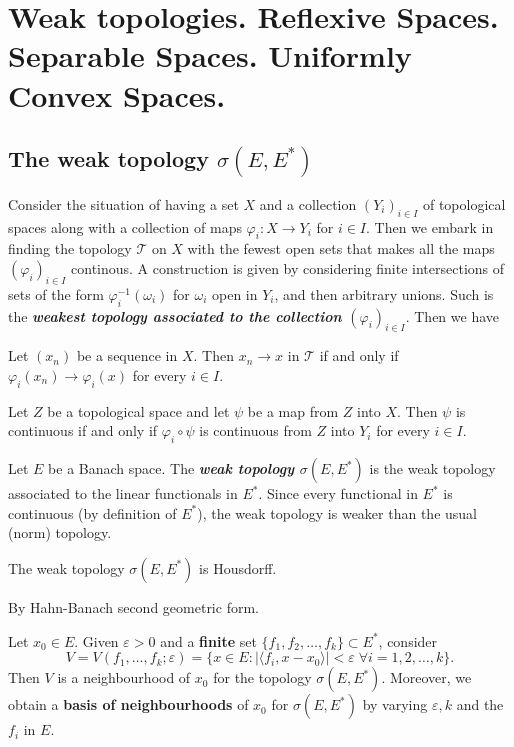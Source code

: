 \documentclass{article}
\theoremstyle{definition}
\numberwithin{equation}{section}
\begin{document}
	\section{Weak topologies. Reflexive Spaces. Separable Spaces. Uniformly Convex Spaces.}
	\subsection{The weak topology $\sigma(E,E^*)$}
	Consider the situation of having a set $X$ and a collection $(Y_i)_{i\in I}$ of topological spaces along with a collection of maps $\varphi_i:X\to Y_i$ for $i\in I$. Then we embark in finding the topology $\mathcal{T}$ on $X$ with the fewest open sets that makes all the maps $(\varphi_i)_{i\in I}$ continous. A construction is given by considering finite intersections of sets of the form $\varphi_i^{-1}(\omega_i)$ for $\omega_i$ open in $Y_i$, and then arbitrary unions. Such is the \textbf{\textit{weakest topology associated to the collection $(\varphi_i)_{i\in I}$}}. Then we have
	\begin{prop}
		Let $(x_n)$ be a sequence in $X$. Then $x_n\to x$ in $\mathcal{T}$ if and only if $\varphi_i(x_n)\to \varphi_i(x)$ for every $i\in I$.
	\end{prop}
	\begin{prop}\label{prop:universal-property-weak-topology}
		Let $Z$ be a topological space and let $\psi$ be a map from $Z$ into $X$. Then $\psi$ is continuous if and only if $\varphi_i\circ\psi$ is continuous from $Z$ into $Y_i$ for every $i\in I$.
	\end{prop}
	Let $E$ be a Banach space. The \textbf{\textit{weak topology $\sigma (E,E^*)$}} is the weak topology associated to the linear functionals in $E^*$. Since every functional in $E^*$ is continuous (by definition of $E^*$), the weak topology is weaker than the usual (norm) topology.
	\begin{prop}
		The weak topology $\sigma(E,E^*)$ is Housdorff.
	\end{prop}
	\begin{prop}
		By Hahn-Banach second geometric form.
	\end{prop}
	\begin{prop}\label{prop:neighbourhoods-weak-topology}
		Let $x_0\in E$. Given $\varepsilon>0$ and a \textbf{finite} set $\{f_1,f_2,\ldots,f_k\}\subset E^*$, consider
		\[V=V(f_1,\ldots,f_k;\varepsilon)=\{x\in E:|\langle f_i,x-x_0\rangle|<\varepsilon\;\forall i=1,2,\ldots,k\}.\]
		Then $V$ is a neighbourhood of $x_0$ for the topology $\sigma(E,E^*)$. Moreover, we obtain a \textbf{basis of neighbourhoods} of $x_0$ for $\sigma(E,E^*)$ by varying $\varepsilon,k$ and the $f_i$ in $E$.
	\end{prop}
\end{document}
